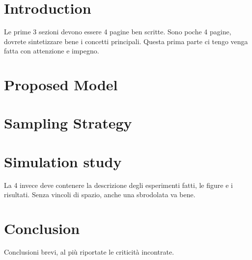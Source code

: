 
\section{Introduction}
Le prime 3 sezioni devono essere 4 pagine ben scritte. Sono poche 4 pagine, dovrete sintetizzare bene i concetti principali. Questa prima parte ci tengo venga fatta con attenzione e impegno.
\section{Proposed Model}
\section{Sampling Strategy}
\section{Simulation study}
La 4 invece deve contenere la descrizione degli esperimenti fatti, le figure e i risultati. Senza vincoli di spazio, anche una sbrodolata va bene.
\section{Conclusion}
Conclusioni brevi, al più riportate le criticità incontrate.